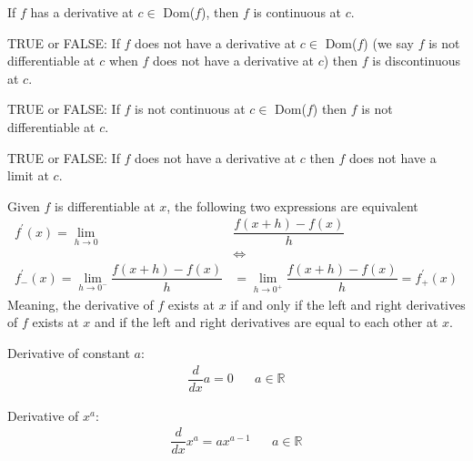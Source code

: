 \begin{theorem}
If $f$ has a derivative at $c \in$ Dom($f$), then $f$ is continuous at $c$.
\end{theorem}

\begin{exercise}
TRUE or FALSE: If $f$ does not have a derivative at $c \in$ Dom($f$) (we say $f$ is not differentiable at $c$ when $f$ does not have a derivative at $c$) then $f$ is discontinuous at $c$.
\end{exercise}

\begin{exercise}
TRUE or FALSE: If $f$ is not continuous at $c \in$ Dom($f$)  then $f$ is not differentiable at $c$.
\end{exercise}

\begin{exercise}
TRUE or FALSE: If $f$ does not have a derivative at $c$ then $f$ does not have a limit at $c$.
\end{exercise}

\begin{theorem}
Given $f$ is differentiable at $x$, the following two expressions are equivalent
\begin{align*}
    f^{'}(x) = \lim_{h \longrightarrow 0}&\dfrac{f(x+h)-f(x)}{h} \hspace{20pt}\\[2ex]
    &\Longleftrightarrow\\[2ex]
    f^{'}_{-}(x) = \lim_{h \longrightarrow 0^{-}} \dfrac{f(x+h)-f(x)}{h} &= \lim_{h \longrightarrow 0^{+}} \dfrac{f(x+h)-f(x)}{h} = f^{'}_{+}(x) 
\end{align*}
Meaning, the derivative of $f$ exists at $x$ if and only if the left and right derivatives of $f$ exists at $x$ and if the left and right derivatives are equal to each other at $x$.
\end{theorem}

\begin{theorem}
Derivative of constant $a$:
\begin{align*}
    \dfrac{d}{dx}a = 0 \hspace{20pt} a \in \mathbb{R}
\end{align*}
\end{theorem}

\begin{theorem}
Derivative of $x^{a}$:
\begin{align*}
    \dfrac{d}{dx}x^{a} = ax^{a-1} \hspace{20pt} a \in \mathbb{R}
\end{align*}
\end{theorem}

